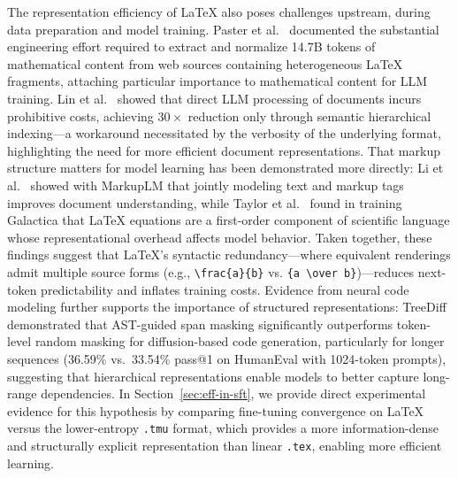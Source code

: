 The representation efficiency of \LaTeX{} also poses challenges upstream, during data preparation and model training. Paster et al.~\cite{paster2023openwebmath} documented the substantial engineering effort required to extract and normalize 14.7B tokens of mathematical content from web sources containing heterogeneous \LaTeX{} fragments, attaching particular importance to mathematical content for LLM training. Lin et al.~\cite{lin2024accurate} showed that direct LLM processing of documents incurs prohibitive costs, achieving $30\times$ reduction only through semantic hierarchical indexing---a workaround necessitated by the verbosity of the underlying format, highlighting the need for more efficient document representations. That markup structure matters for model learning has been demonstrated more directly: Li et al.~\cite{li2022markuplm} showed with MarkupLM that jointly modeling text and markup tags improves document understanding, while Taylor et al.~\cite{taylor2022galactica} found in training Galactica that \LaTeX{} equations are a first-order component of scientific language whose representational overhead affects model behavior. Taken together, these findings suggest that \LaTeX{}'s syntactic redundancy---where equivalent renderings admit multiple source forms (e.g., \verb|\frac{a}{b}| vs. \verb|{a \over b}|)---reduces next-token predictability and inflates training costs. Evidence from neural code modeling further supports the importance of structured representations: TreeDiff~\cite{zeng2026treediffastguidedcodegeneration} demonstrated that AST-guided span masking significantly outperforms token-level random masking for diffusion-based code generation, particularly for longer sequences (36.59\% vs.\ 33.54\% pass@1 on HumanEval with 1024-token prompts), suggesting that hierarchical representations enable models to better capture long-range dependencies. In Section~\ref{sec:eff-in-sft}, we provide direct experimental evidence for this hypothesis by comparing fine-tuning convergence on \LaTeX{} versus the lower-entropy \texttt{.tmu} format, which provides a more information-dense and structurally explicit representation than linear \texttt{.tex}, enabling more efficient learning.

